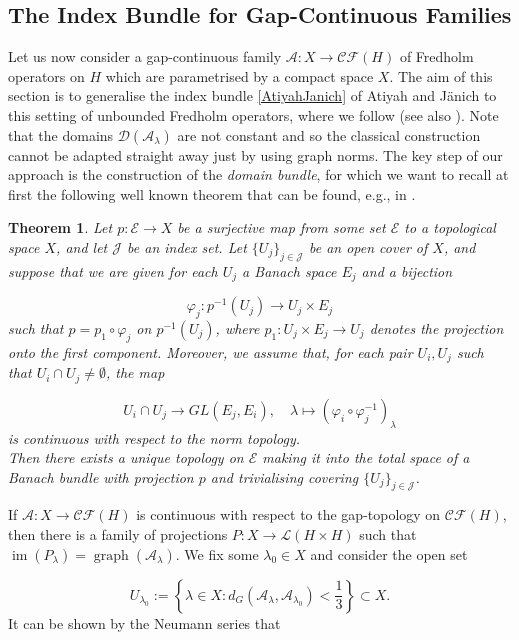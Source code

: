 \documentclass[a4paper,10pt]{article}
\newtheorem{theorem}{Theorem}[section]
\DeclareMathOperator{\im}{im}
\DeclareMathOperator{\gra}{graph}
\begin{document}
\subsection{The Index Bundle for Gap-Continuous Families}
Let us now consider a gap-continuous family $\mathcal{A}:X\rightarrow\mathcal{CF}(H)$ of Fredholm operators on $H$ which are parametrised by a compact space $X$. The aim of this section is to generalise the index bundle \eqref{AtiyahJanich} of Atiyah and J\"anich to this setting of unbounded Fredholm operators, where we follow \cite{thesis} (see also \cite{Mike}). Note that the domains $\mathcal{D}(\mathcal{A}_\lambda)$ are not constant and so the classical construction cannot be adapted straight away just by using graph norms. The key step of our approach is the construction of the \textit{domain bundle}, for which we want to recall at first the following well known theorem that can be found, e.g.,  in \cite[Thm. 3.2]{Steenrod}.

\begin{theorem}\label{bundleconstructiontheorem}
Let $p:\mathcal{E}\rightarrow X$ be a surjective map from some set $\mathcal{E}$ to a topological space
$X$, and let $\mathcal{J}$ be an index set. Let $\{U_j\}_{j\in\mathcal{J}}$ be an open cover of $X$, and suppose that we are given for each $U_j$ a Banach space $E_j$ and a bijection 

\[\varphi_j:p^{-1}(U_j)\rightarrow U_j\times E_j\]
such that $p=p_1\circ\varphi_j$ on $p^{-1}(U_j)$, where $p_1:U_j\times E_j\rightarrow U_j$ denotes the projection onto the first component. Moreover, we assume that, for each pair $U_i,U_j$ such that $U_i\cap U_j\neq\emptyset$, the map

\[U_i\cap U_j\rightarrow GL(E_j,E_i),\quad \lambda\mapsto(\varphi_i\circ\varphi^{-1}_j)_\lambda\]
is continuous with respect to the norm topology.\\
Then there exists a unique topology on $\mathcal{E}$ making it into the total space of a Banach bundle
with projection $p$ and trivialising covering $\{U_j\}_{j\in\mathcal{J}}$.
\end{theorem}
\noindent
If $\mathcal{A}:X\rightarrow\mathcal{CF}(H)$ is continuous with respect to the gap-topology on $\mathcal{CF}(H)$, then there is a family of projections $P:X\rightarrow\mathcal{L}(H\times H)$ such that $\im(P_\lambda)=\gra(\mathcal{A}_\lambda)$. We fix some $\lambda_0\in X$ and consider the open set 

\[U_{\lambda_0}:=\left\{\lambda\in X:d_G(\mathcal{A}_\lambda,\mathcal{A}_{\lambda_0})<\frac{1}{3}\right\}\subset X.\]
It can be shown by the Neumann series that
\end{document}
